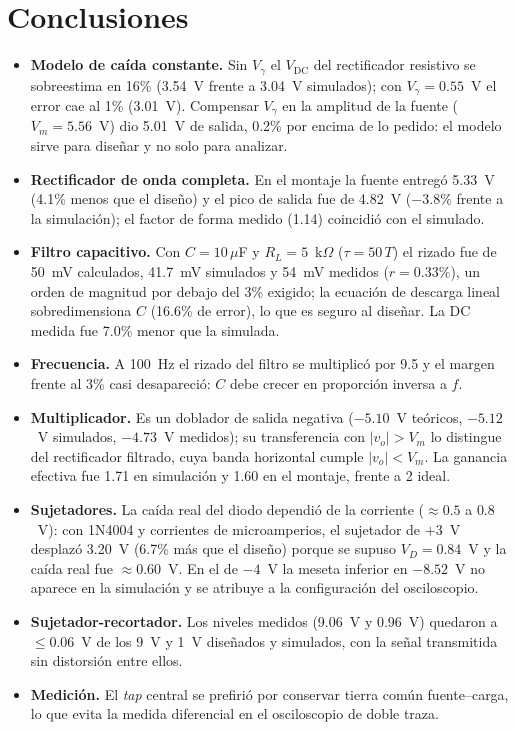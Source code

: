 \documentclass[conference,10pt]{IEEEtran}
\newcommand{\VDC}{V_{\mathrm{DC}}}
\newcommand{\Vg}{V_\gamma}
\begin{document}
\section{Conclusiones}
\begin{itemize}
\item \textbf{Modelo de caída constante.} Sin $\Vg$ el $\VDC$ del
rectificador resistivo se sobreestima en 16\% (3.54~V frente a 3.04~V
simulados); con $\Vg=0.55$~V el error cae al 1\% (3.01~V). Compensar
$\Vg$ en la amplitud de la fuente ($V_m=5.56$~V) dio 5.01~V de salida,
0.2\% por encima de lo pedido: el modelo sirve para diseñar y no solo
para analizar.

\item \textbf{Rectificador de onda completa.} En el montaje la fuente
entregó 5.33~V (4.1\% menos que el diseño) y el pico de salida fue de
4.82~V ($-3.8\%$ frente a la simulación); el factor de forma medido
(1.14) coincidió con el simulado.

\item \textbf{Filtro capacitivo.} Con $C=10\,\mu$F y $R_L=5$~k$\Omega$
($\tau=50\,T$) el rizado fue de 50~mV calculados, 41.7~mV simulados y
54~mV medidos ($r=0.33\%$), un orden de magnitud por debajo del 3\%
exigido; la ecuación de descarga lineal sobredimensiona $C$ (16.6\% de
error), lo que es seguro al diseñar. La DC medida fue 7.0\% menor que la
simulada.

\item \textbf{Frecuencia.} A 100~Hz el rizado del filtro se multiplicó
por 9.5 y el margen frente al 3\% casi desapareció: $C$ debe crecer en
proporción inversa a $f$.

\item \textbf{Multiplicador.} Es un doblador de salida negativa
($-5.10$~V teóricos, $-5.12$~V simulados, $-4.73$~V medidos); su
transferencia con $|v_o|>V_m$ lo distingue del rectificador filtrado,
cuya banda horizontal cumple $|v_o|<V_m$. La ganancia efectiva fue 1.71
en simulación y 1.60 en el montaje, frente a 2 ideal.

\item \textbf{Sujetadores.} La caída real del diodo dependió de la
corriente ($\approx0.5$ a $0.8$~V): con 1N4004 y corrientes de
microamperios, el sujetador de $+3$~V desplazó 3.20~V (6.7\% más que el
diseño) porque se supuso $V_D=0.84$~V y la caída real fue
$\approx0.60$~V. En el de $-4$~V la meseta inferior en $-8.52$~V no
aparece en la simulación y se atribuye a la configuración del
osciloscopio.

\item \textbf{Sujetador-recortador.} Los niveles medidos (9.06~V y
0.96~V) quedaron a $\le0.06$~V de los 9~V y 1~V diseñados y simulados,
con la señal transmitida sin distorsión entre ellos.

\item \textbf{Medición.} El \textit{tap} central se prefirió por
conservar tierra común fuente--carga, lo que evita la medida diferencial
en el osciloscopio de doble traza.
\end{itemize}
\end{document}
